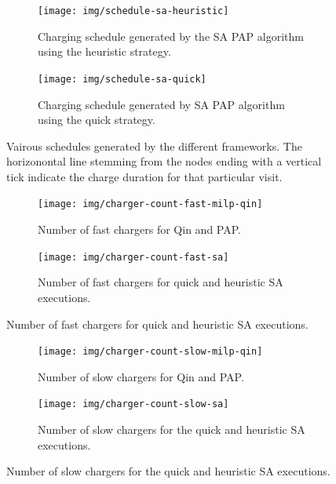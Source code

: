 \documentclass[energies,article,submit,moreauthors]{Definitions/mdpi}
\begin{document}
\begin{figure} \ContinuedFloat
  \centering

  \begin{subfigure}[t]{\textwidth}
    \centering \texttt{[image: img/schedule-sa-heuristic]}
    \caption{Charging schedule generated by the SA PAP algorithm using the heuristic strategy.}
    \label{subfig:schedule-heuristic-sa}
  \end{subfigure}

  \hfill

  \begin{subfigure}[t]{\textwidth}
    \centering \texttt{[image: img/schedule-sa-quick]}
    \caption{Charging schedule generated by SA PAP algorithm using the quick strategy.}
    \label{subfig:schedule-quick-sa}
  \end{subfigure}
  \caption{Vairous schedules generated by the different frameworks. The horizonontal line stemming from the nodes ending with a vertical tick indicate the charge duration for that particular visit.}
  \label{fig:schedule}
\end{figure}

\begin{figure}
    \begin{subfigure}[t]{\textwidth}
    \centering
        \texttt{[image: img/charger-count-fast-milp-qin]}
        \caption{Number of fast chargers for Qin and PAP.}
        \label{subfig:fast-charger-usage-milp-qinn}
    \end{subfigure}

    \begin{subfigure}[t]{\textwidth}
    \centering
        \texttt{[image: img/charger-count-fast-sa]}
        \caption{Number of fast chargers for quick and heuristic SA executions.}
        \label{subfig:fast-charger-usage-sa}
    \end{subfigure}
\end{figure}

\begin{figure}
    \begin{subfigure}[t]{\textwidth}
    \centering
        \texttt{[image: img/charger-count-slow-milp-qin]}
        \caption{Number of slow chargers for Qin and PAP.}
        \label{subfig:slow-charger-usage-milp-qinn}
    \end{subfigure}
    \begin{subfigure}[t]{\textwidth}
    \centering
        \texttt{[image: img/charger-count-slow-sa]}
        \caption{Number of slow chargers for the quick and heuristic SA executions.}
        \label{subfig:slow-charger-usage-sa}
    \end{subfigure}
\end{figure}
\end{document}

